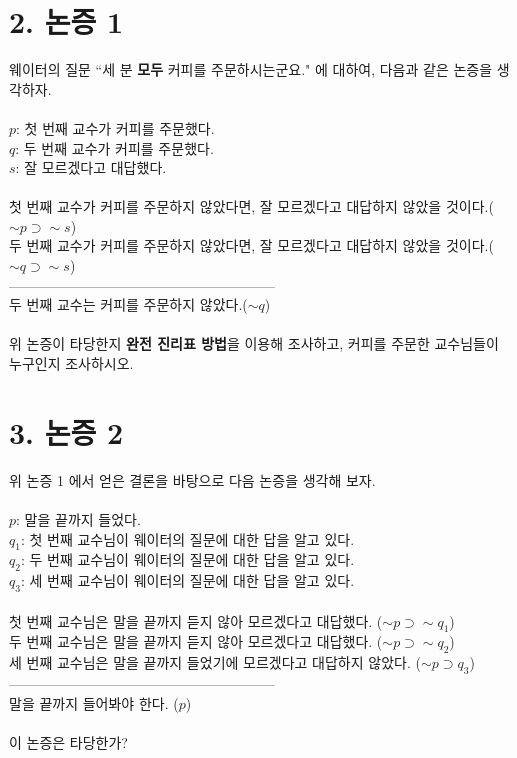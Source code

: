 \documentclass[12pt]{report}
\begin{document}
\section*{2. 논증 1}
웨이터의 질문 ``세 분 \textbf{모두} 커피를 주문하시는군요." 에 대하여, 다음과 같은 논증을 생각하자.\\~\\
$p$: 첫 번째 교수가 커피를 주문했다. \\
$q$: 두 번째 교수가 커피를 주문했다. \\
$s$: 잘 모르겠다고 대답했다.\\~\\
첫 번째 교수가 커피를 주문하지 않았다면, 잘 모르겠다고 대답하지 않았을 것이다.($\sim p \supset \sim s$)\\
두 번째 교수가 커피를 주문하지 않았다면, 잘 모르겠다고 대답하지 않았을 것이다.($\sim q \supset \sim s$)\\
---------------------------------------------------------\\
두 번째 교수는 커피를 주문하지 않았다.($\sim q$)\\~\\
위 논증이 타당한지 \textbf{완전 진리표 방법}을 이용해 조사하고, 커피를 주문한 교수님들이 누구인지 조사하시오.
\pagebreak

\section*{3. 논증 2}
위 논증 1 에서 얻은 결론을 바탕으로 다음 논증을 생각해 보자.\\~\\
$p$: 말을 끝까지 들었다. \\
$q_1$: 첫 번째 교수님이 웨이터의 질문에 대한 답을 알고 있다.\\
$q_2$: 두 번째 교수님이 웨이터의 질문에 대한 답을 알고 있다.\\
$q_3$: 세 번째 교수님이 웨이터의 질문에 대한 답을 알고 있다.\\~\\
첫 번째 교수님은 말을 끝까지 듣지 않아 모르겠다고 대답했다. ($\sim p \supset \sim q_1$)\\
두 번째 교수님은 말을 끝까지 듣지 않아 모르겠다고 대답했다. ($\sim p \supset \sim q_2$)\\
세 번째 교수님은 말을 끝까지 들었기에 모르겠다고 대답하지 않았다. ($\sim p \supset q_3$)\\
---------------------------------------------------------\\
말을 끝까지 들어봐야 한다. ($p$)\\~\\
이 논증은 타당한가?
\pagebreak
\end{document}
